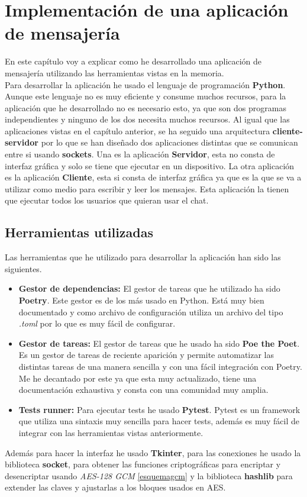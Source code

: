 \chapter{Implementación de una aplicación de mensajería}

En este capítulo voy a explicar como he desarrollado una aplicación de mensajería utilizando las herramientas vistas en la memoria.\\
Para desarrollar la aplicación he usado el lenguaje de programación \textbf{Python}. Aunque este lenguaje no es muy eficiente y consume muchos recursos, para la aplicación que he desarrollado no es necesario esto, ya que son dos programas independientes y ninguno de los dos necesita muchos recursos. Al igual que las aplicaciones vistas en el capítulo anterior, se ha seguido una arquitectura \textbf{cliente-servidor} por lo que se han diseñado dos aplicaciones distintas que se comunican entre si usando \textbf{sockets}. Una es la aplicación \textbf{Servidor}, esta no consta de interfaz gráfica y solo se tiene que ejecutar en un dispositivo. La otra aplicación es la aplicación \textbf{Cliente}, esta si consta de interfaz gráfica ya que es la que se va a utilizar como medio para escribir y leer los mensajes. Esta aplicación la tienen que ejecutar todos los usuarios que quieran usar el chat.

\section{Herramientas utilizadas}
Las herramientas que he utilizado para desarrollar la aplicación han sido las siguientes.
\begin{itemize}
	\item \textbf{Gestor de dependencias:} El gestor de tareas que he utilizado ha sido \textbf{Poetry}. Este gestor es de los más usado en Python. Está muy bien documentado y como archivo de configuración utiliza un archivo del tipo \emph{.toml} por lo que es muy fácil de configurar. 
	\item \textbf{Gestor de tareas:} El gestor de tareas que he usado ha sido \textbf{Poe the Poet}. Es un gestor de tareas de reciente aparición y permite automatizar las distintas tareas de una manera sencilla y con una fácil integración con Poetry. Me he decantado por este ya que esta muy actualizado, tiene una documentación exhaustiva y consta con una comunidad muy amplia.
	\item \textbf{Tests runner:} Para ejecutar tests he usado \textbf{Pytest}. Pytest es un framework que utiliza una sintaxis muy sencilla para hacer tests, además es muy fácil de integrar con las herramientas vistas anteriormente.
\end{itemize}
Además para hacer la interfaz he usado \textbf{Tkinter}, para las conexiones he usado la biblioteca \textbf{socket}, para obtener las funciones criptográficas para encriptar y desencriptar usando \emph{AES-128 GCM} \ref{esquemagcm} y la biblioteca \textbf{hashlib} para extender las claves y ajustarlas a los bloques usados en AES.

